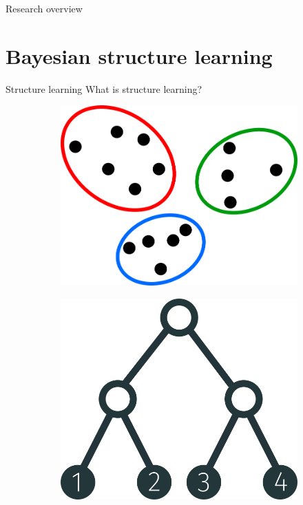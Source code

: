 \documentclass[10pt, compress]{beamer}
\begin{document}
\begin{frame}{Research overview}
  \centering
\end{frame}

\section{Bayesian structure learning}

\begin{frame}{Structure learning}
  \centering
  What is structure learning?

  \pause
  \centering
  \begin{figure}
    \centering
    \pause
    \begin{subfigure}[t]{0.27\textwidth}
        \centering
        \includegraphics[width=\textwidth]{img/clustering}
    \end{subfigure}
    \pause
    \hfill
    \begin{subfigure}[t]{0.27\textwidth}
        \centering
        \includegraphics[width=\textwidth]{img/tree-1234-balanced}

\end{subfigure}
\end{figure}
\end{frame}
\end{document}
